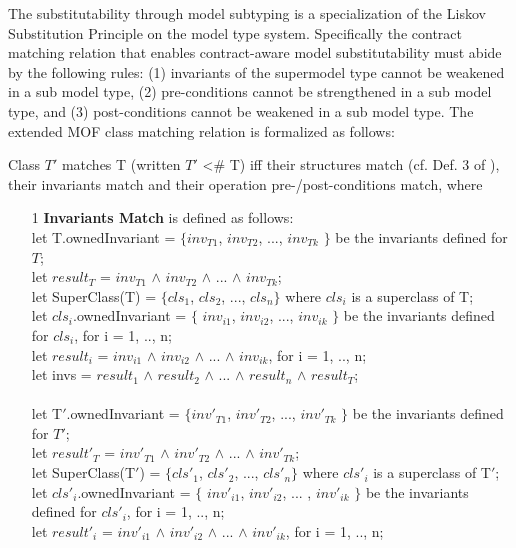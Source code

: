 The substitutability through model subtyping is a specialization of the Liskov Substitution Principle \cite{liskov1994behavioral} on the model type system. 
Specifically the contract matching relation that enables contract-aware model substitutability must abide by the following rules: (1) invariants of the supermodel type cannot be weakened in a sub model type, (2) pre-conditions cannot be strengthened in a sub model type, and (3) post-conditions cannot be weakened in a sub model type.
The extended MOF class matching relation is formalized as follows:

\begin{definition} Class $T'$ matches T (written $T'$ <\# T) iff their structures match (cf. Def. 3 of \cite{ecmfa12}), their invariants match and their operation pre-/post-conditions match, where
\begin{enumerate}
\item[1] \textbf{Invariants Match} is defined as follows:\\
let T.ownedInvariant = $\{$$inv_{T1}$, $inv_{T2}$, ..., $inv_{Tk}$ $\}$ be the invariants defined for $T$;\\
let $result_T$ = $inv_{T1}$ $\wedge$ $inv_{T2}$ $\wedge$ ... $\wedge$ $inv_{Tk}$;\\
let SuperClass(T) = $\{$$cls_1$, $cls_2$, ..., $cls_n$$\}$ where $cls_i$ is a superclass of T; \\
let $cls_i$.ownedInvariant = $\{$ $inv_{i1}$, $inv_{i2}$, ..., $inv_{ik}$ $\}$ be the invariants defined for $cls_i$, for i = 1, .., n;\\
let $result_i$ = $inv_{i1}$ $\wedge$ $inv_{i2}$ $\wedge$ ... $\wedge$ $inv_{ik}$, for i = 1, .., n;\\
let invs = $result_1$ $\wedge$ $result_2$ $\wedge$ ... $\wedge$ $result_n$ $\wedge$ $result_T$;\\
\\
let T$'$.ownedInvariant = $\{$$inv'_{T1}$, $inv'_{T2}$, ..., $inv'_{Tk}$ $\}$ be the invariants defined for $T'$;\\
let $result'_T$ = $inv'_{T1}$ $\wedge$ $inv'_{T2}$ $\wedge$ ... $\wedge$ $inv'_{Tk}$;\\
let SuperClass(T$'$) = $\{$$cls'_1$, $cls'_2$, ..., $cls'_n$$\}$ where $cls'_i$ is a superclass of T$'$; \\
let $cls'_i$.ownedInvariant = $\{$ $inv'_{i1}$, $inv'_{i2}$, ... , $inv'_{ik}$ $\}$ be the invariants defined for $cls'_i$, for i = 1, .., n;\\
let $result'_i$ = $inv'_{i1}$ $\wedge$ $inv'_{i2}$ $\wedge$ ... $\wedge$ $inv'_{ik}$, for i = 1, .., n;\\

\end{enumerate}
\end{definition}
